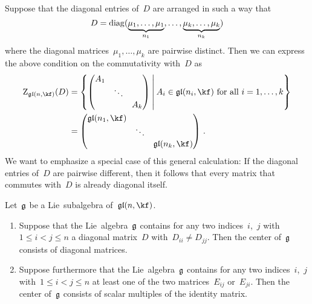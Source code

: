 \begin{recall}
\begin{enumerate}
			Suppose that the diagonal entries of~$D$ are arranged in such a way that
			\[
				D
				=
				\operatorname{diag}
				(
					\underbrace{ \mu_1, \dotsc, \mu_1 }_{n_1},
					\dotsc,
					\underbrace{\mu_k, \dotsc, \mu_k}_{n_k}
				)
			\]
			where the diagonal matrices~$\mu_1, \dotsc, \mu_k$ are pairwise distinct.
			Then we can express the above condition on the commutativity with~$D$ as
			\begin{align*}
				\centerlie_{\gllie(n, \kf)}(D)
				&=
				\left\{
					\begin{pmatrix}
						A_1 &         &     \\
								& \ddots  &     \\
								&         & A_k
					\end{pmatrix}
				\suchthat*
					\text{$A_i \in \gllie(n_i, \kf)$ for all~$i = 1, \dotsc, k$}
				\right\}
				\\
				&=
				\begin{pmatrix}
					\gllie(n_1, \kf) &        &                   \\
					                 & \ddots &                   \\
					                 &        & \gllie(n_k, \kf)
				\end{pmatrix} \,.
			\end{align*}
			We want to emphasize a special case of this general calculation:
			If the diagonal entries of~$D$ are pairwise different, then it follows that every matrix that commutes with~$D$ is already diagonal itself.
	\end{enumerate}
\end{recall}


\begin{lemma}
	\label{center consists of diagonal matrices}
	Let~$\mathfrak{g}$ be a Lie~subalgebra of~$\gllie(n, \kf)$.
	\begin{enumerate}
		\item
			Suppose that the Lie~algebra~$\mathfrak{g}$ contains for any two indices~$i$,~$j$ with~$1 \leq i < j \leq n$ a diagonal matrix~$D$ with~$D_{ii} \neq D_{jj}$.
			Then the center of~$\mathfrak{g}$ consists of diagonal matrices.
		\item
			Suppose furthermore that the Lie~algebra~$\mathfrak{g}$ contains for any two indices~$i$,~$j$ with~$1 \leq i < j \leq n$ at least one of the two matrices~$E_{ij}$ or~$E_{ji}$.
			Then the center of~$\mathfrak{g}$ consists of scalar multiples of the identity matrix.
	\end{enumerate}
\end{lemma}


